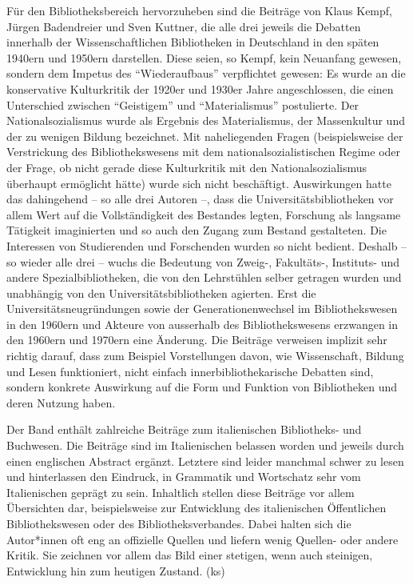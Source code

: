 \documentclass[a4paper,
fontsize=11pt,
oneside,
numbers=noperiodatend,
parskip=half-,
bibliography=totoc,
final
]{scrartcl}
\begin{document}
Für den Bibliotheksbereich hervorzuheben sind die Beiträge von Klaus
Kempf, Jürgen Badendreier und Sven Kuttner, die alle drei jeweils die
Debatten innerhalb der Wissenschaftlichen Bibliotheken in Deutschland in
den späten 1940ern und 1950ern darstellen. Diese seien, so Kempf, kein
Neuanfang gewesen, sondern dem Impetus des \enquote{Wiederaufbaus}
verpflichtet gewesen: Es wurde an die konservative Kulturkritik der
1920er und 1930er Jahre angeschlossen, die einen Unterschied zwischen
\enquote{Geistigem} und \enquote{Materialismus} postulierte. Der
Nationalsozialismus wurde als Ergebnis des Materialismus, der
Massenkultur und der zu wenigen Bildung bezeichnet. Mit naheliegenden
Fragen (beispielsweise der Verstrickung des Bibliothekswesens mit dem
nationalsozialistischen Regime oder der Frage, ob nicht gerade diese
Kulturkritik mit den Nationalsozialismus überhaupt ermöglicht hätte)
wurde sich nicht beschäftigt. Auswirkungen hatte das dahingehend -- so
alle drei Autoren --, dass die Universitätsbibliotheken vor allem Wert
auf die Vollständigkeit des Bestandes legten, Forschung als langsame
Tätigkeit imaginierten und so auch den Zugang zum Bestand gestalteten.
Die Interessen von Studierenden und Forschenden wurden so nicht bedient.
Deshalb -- so wieder alle drei -- wuchs die Bedeutung von Zweig-,
Fakultäts-, Instituts- und andere Spezialbibliotheken, die von den
Lehrstühlen selber getragen wurden und unabhängig von den
Universitätsbibliotheken agierten. Erst die Universitätsneugründungen
sowie der Generationenwechsel im Bibliothekswesen in den 1960ern und
Akteure von ausserhalb des Bibliothekswesens erzwangen in den 1960ern
und 1970ern eine Änderung. Die Beiträge verweisen implizit sehr richtig
darauf, dass zum Beispiel Vorstellungen davon, wie Wissenschaft, Bildung
und Lesen funktioniert, nicht einfach innerbibliothekarische Debatten
sind, sondern konkrete Auswirkung auf die Form und Funktion von
Bibliotheken und deren Nutzung haben.

Der Band enthält zahlreiche Beiträge zum italienischen Bibliotheks- und
Buchwesen. Die Beiträge sind im Italienischen belassen worden und
jeweils durch einen englischen Abstract ergänzt. Letztere sind leider
manchmal schwer zu lesen und hinterlassen den Eindruck, in Grammatik und
Wortschatz sehr vom Italienischen geprägt zu sein. Inhaltlich stellen
diese Beiträge vor allem Übersichten dar, beispielsweise zur Entwicklung
des italienischen Öffentlichen Bibliothekswesen oder des
Bibliotheksverbandes. Dabei halten sich die Autor*innen oft eng an
offizielle Quellen und liefern wenig Quellen- oder andere Kritik. Sie
zeichnen vor allem das Bild einer stetigen, wenn auch steinigen,
Entwicklung hin zum heutigen Zustand. (ks)
\end{document}
